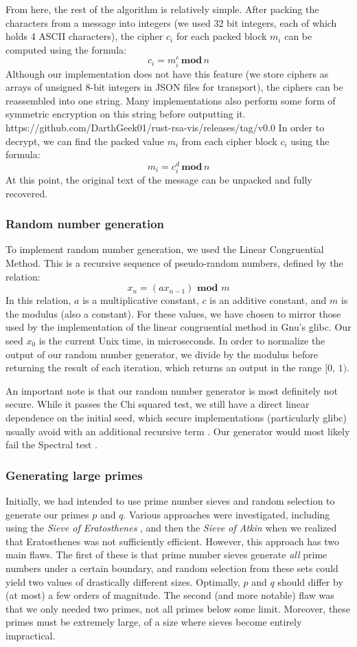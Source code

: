 \documentclass{article}
\begin{document}
From here, the rest of the algorithm is relatively simple. After packing the characters from a message into integers (we used 32 bit integers, each of which holds 4 ASCII characters), the cipher $c_i$ for each packed block $m_i$ can be computed using the formula:
\[ c_i = m_i^e\, \textbf{mod} \, n \]
Although our implementation does not have this feature (we store ciphers as arrays of unsigned 8-bit integers in JSON files for transport), the ciphers can be reassembled into one string. Many implementations also perform some form of symmetric encryption on this string before outputting it.
https://github.com/DarthGeek01/rust-rsa-vis/releases/tag/v0.0
In order to decrypt, we can find the packed value $m_i$ from each cipher block $c_i$ using the formula:
	\[ m_i = c_i^d \,\textbf{mod}\, n \]
At this point, the original text of the message can be unpacked and fully recovered.

\subsubsection{Random number generation}
To implement random number generation, we used the Linear Congruential Method. This is a recursive sequence of pseudo-random numbers, defined by the relation:
\[ x_n = (ax_{n - 1}) \textbf{ mod } m \]
In this relation, $a$ is a multiplicative constant, $c$ is an additive constant, and $m$ is the modulus (also a constant). For these values, we have chosen to mirror those used by the implementation of the linear congruential method in Gnu's glibc. Our seed $x_0$ is the current Unix time, in microseconds. In order to normalize the output of our random number generator, we divide by the modulus before returning the result of each iteration, which returns an output in the range $[0,\, 1)$.

An important note is that our random number generator is most definitely not secure. While it passes the Chi squared test, we still have a direct linear dependence on the initial seed, which secure implementations (particularly glibc) usually avoid with an additional recursive term \cite{lcm}. Our generator would most likely fail the Spectral test \cite{spectral}.

\subsubsection{Generating large primes}
Initially, we had intended to use prime number sieves and random selection to generate our primes $p$ and $q$. Various approaches were investigated, including using the \textit{Sieve of Eratosthenes} \cite{sieveeratosthenes}, and then the \textit{Sieve of Atkin} \cite{sieveatkin} when we realized that Eratosthenes was not sufficiently efficient. However, this approach has two main flaws. The first of these is that prime number sieves generate \textit{all} prime numbers under a certain boundary, and random selection from these sets could yield two values of drastically different sizes. Optimally, $p$ and $q$ should differ by (at most) a few orders of magnitude. The second (and more notable) flaw was that we only needed two primes, not all primes below some limit. Moreover, these primes must be extremely large, of a size where sieves become entirely impractical.
\end{document}
